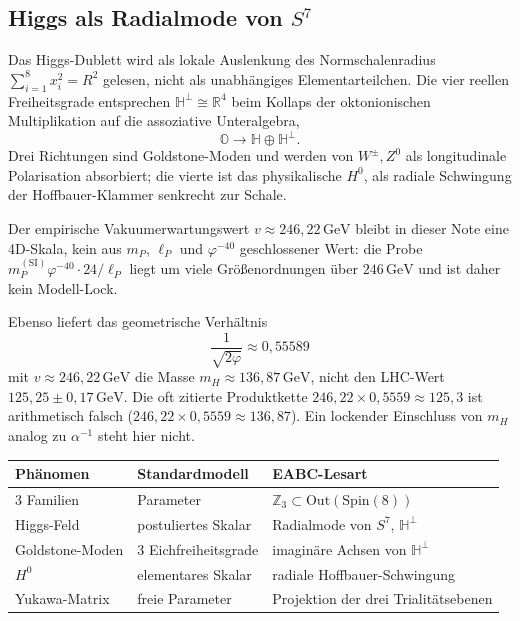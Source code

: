 \documentclass[11pt,a4paper]{article}
\begin{document}
\subsection{Higgs als Radialmode von $S^7$}
Das Higgs-Dublett wird als lokale Auslenkung des Normschalenradius $\sum_{i=1}^8 x_i^2=R^2$ gelesen, nicht als unabhängiges Elementarteilchen.
Die vier reellen Freiheitsgrade entsprechen $\mathbb{H}^\perp\cong\mathbb{R}^4$ beim Kollaps der oktonionischen Multiplikation auf die assoziative Unteralgebra,
\begin{equation}
\mathbb{O}\longrightarrow\mathbb{H}\oplus\mathbb{H}^\perp.
\end{equation}
Drei Richtungen sind Goldstone-Moden und werden von $W^\pm,Z^0$ als longitudinale Polarisation absorbiert; die vierte ist das physikalische $H^0$, als radiale Schwingung der Hoffbauer-Klammer senkrecht zur Schale.

Der empirische Vakuumerwartungswert $v\approx 246{,}22\,\mathrm{GeV}$ bleibt in dieser Note eine 4D-Skala, kein aus $m_P$, $\ell_P$ und $\varphi^{-40}$ geschlossener Wert:
die Probe $m_P^{\mathrm{(SI)}}\varphi^{-40}\cdot 24/\ell_P$ liegt um viele Größenordnungen über $246\,\mathrm{GeV}$ und ist daher kein Modell-Lock.

Ebenso liefert das geometrische Verhältnis
\begin{equation}
\frac{1}{\sqrt{2\varphi}}\approx 0{,}55589
\end{equation}
mit $v\approx 246{,}22\,\mathrm{GeV}$ die Masse $m_H\approx 136{,}87\,\mathrm{GeV}$, nicht den LHC-Wert $125{,}25\pm 0{,}17\,\mathrm{GeV}$.
Die oft zitierte Produktkette $246{,}22\times 0{,}5559\approx 125{,}3$ ist arithmetisch falsch ($246{,}22\times 0{,}5559\approx 136{,}87$).
Ein lockender Einschluss von $m_H$ analog zu $\alpha^{-1}$ steht hier nicht.

\begin{center}
{\small
\begin{tabular}{@{}lll@{}}
\toprule
Phänomen & Standardmodell & EABC-Lesart \\
\midrule
3 Familien & Parameter & $\mathbb{Z}_3\subset\mathrm{Out}(\mathrm{Spin}(8))$ \\
Higgs-Feld & postuliertes Skalar & Radialmode von $S^7$, $\mathbb{H}^\perp$ \\
Goldstone-Moden & 3 Eichfreiheitsgrade & imaginäre Achsen von $\mathbb{H}^\perp$ \\
$H^0$ & elementares Skalar & radiale Hoffbauer-Schwingung \\
Yukawa-Matrix & freie Parameter & Projektion der drei Trialitätsebenen \\
\bottomrule
\end{tabular}}
\end{center}
\end{document}
